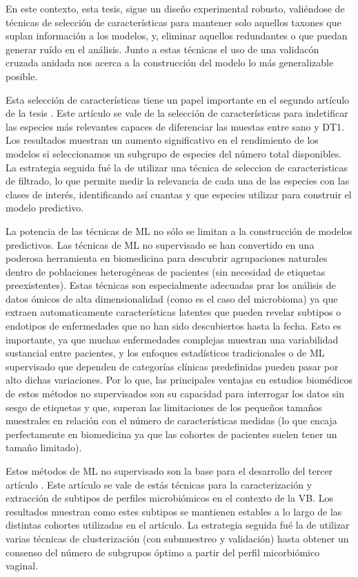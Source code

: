 En este contexto, esta tesis, sigue un diseño experimental robusto, valiéndose de técnicas de selección de características para mantener solo aquellos taxones que suplan información a los modelos, y, eliminar aquellos redundantes o que puedan generar ruído en el análisis. Junto a estas técnicas el uso de una validacón cruzada anidada nos acerca a la construcción del modelo lo más generalizable posible.

Esta selección de características tiene un papel importante en el segundo artículo de la tesis . Este artículo se vale de la selección de características para indetificar las especies más relevantes capaces de diferenciar las muestas entre sano y DT1. Los resultados muestran un aumento significativo en el rendimiento de los modelos si seleccionamos un subgrupo de especies del número total disponibles. La estrategia seguida fué la de utilizar una técnica de seleccion de caracteristicas de filtrado, lo que permite medir la relevancia de cada una de las especies con las clases de interés, identificando así cuantas y que especies utilizar para construir el modelo predictivo.


La potencia de las técnicas de ML no sólo se limitan a la construcción de modelos predictivos. Las técnicas de ML no supervisado se han convertido en una poderosa herramienta en biomedicina para descubrir agrupaciones naturales dentro de poblaciones heterogéneas de pacientes (sin necesidad de etiquetas preexistentes). Estas técnicas son especialmente adecuadas prar los análisis de datos ómicos de alta dimensionalidad (como es el caso del microbioma) ya que extraen automaticamente características latentes que pueden revelar subtipos o endotipos de enfermedades que no han sido descubiertos hasta la fecha. Esto es importante, ya que muchas enfermedades complejas muestran una variabilidad sustancial entre pacientes, y los enfoques estadísticos tradicionales o de ML supervisado que dependen de categorías clínicas predefinidas pueden pasar por alto dichas variaciones. Por lo que, las principales ventajas en estudios biomédicos de estos métodos no supervisados son su capacidad para interrogar los datos sin sesgo de etiquetas y que, superan las limitaciones de los pequeños tamaños muestrales en relación con el número de características medidas (lo que encaja perfectamente en biomedicina ya que las cohortes de pacientes suelen tener un tamaño limitado).

Estos métodos de ML no supervisado son la base para el desarrollo del tercer artículo . Este artículo se vale de estás técnicas para la caracterización y extracción de subtipos de perfiles microbiómicos en el contexto de la VB. Los resultados muestran como estes subtipos se mantienen estables a lo largo de las distintas cohortes utilizadas en el artículo. La estrategia seguida fué la de utilizar varias técnicas de clusterización (con submuestreo y validación) hasta obtener un consenso del número de subgrupos óptimo a partir del perfil micorbiómico vaginal. 


